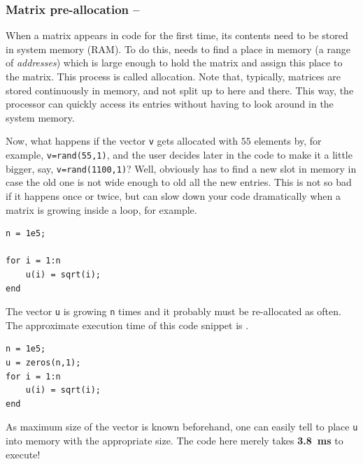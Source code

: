 \subsubsection{Matrix pre-allocation -- \fastsymbol\fastsymbol\fastsymbol\fastsymbol\fastsymbol}

When a matrix appears in \matlab{} code for the first time, its contents need to be
stored in system memory (RAM). To do this, \matlab{} needs to find a place in memory (a
range of \emph{addresses}) which is large enough to hold the matrix and assign this
place to the matrix. This process is called allocation. Note that, typically, matrices
are stored continuously in memory, and not split up to here and there. This way, the
processor can quickly access its entries without having to look around in the system
memory.


Now, what happens if the vector \lstinline!v! gets allocated with $55$
elements by, for example, \lstinline!v=rand(55,1)!, and the user decides later
in the code to make it a little bigger, say, \lstinline!v=rand(1100,1)!? Well,
obviously \matlab{} has to find a new slot in memory in case the old one is
not wide enough to old all the new entries. This is not so bad if it happens
once or twice, but can slow down your code dramatically when a matrix is
growing inside a loop, for example.


\hfill
\begin{minipage}[t]{.45\textwidth}
\begin{lstlisting}[framerule=2pt,rulecolor=\color{badred}]
n = 1e5;

for i = 1:n
    u(i) = sqrt(i);
end
\end{lstlisting}
The vector \lstinline!u! is growing \lstinline!n! times and it probably must be
re-allocated as often. The approximate execution time of this code snippet is
.
\end{minipage}
\hfill
\begin{minipage}[t]{.45\textwidth}
\begin{lstlisting}[framerule=2pt,rulecolor=\color{goodgreen}]
n = 1e5;
u = zeros(n,1);
for i = 1:n
    u(i) = sqrt(i);
end
\end{lstlisting}
As maximum size of the vector is known beforehand, one can easily tell
\matlab{} to place \lstinline!u! into memory with the appropriate size. The
code here merely takes \textbf{\SI{3.8}{\milli\second}} to execute!
\end{minipage}
\hfill

